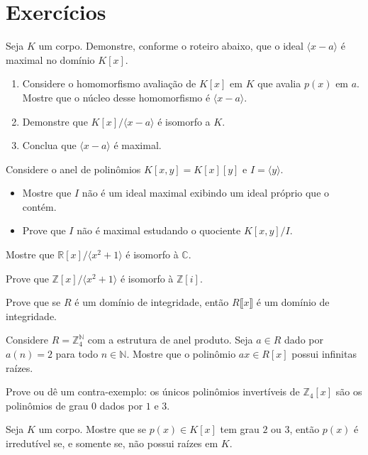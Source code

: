 \section{Exercícios}
\begin{exer}
    Seja $K$ um corpo. Demonstre, conforme o roteiro abaixo, que o ideal $\langle x-a\rangle$ é maximal no domínio $K[x]$.
    \begin{enumerate}[label=\alph*)]
        \item Considere o homomorfismo avaliação de $K[x]$ em $K$ que avalia $p(x)$ em $a$. Mostre que o núcleo desse homomorfismo é $\langle x-a\rangle$.
        \item Demonstre que $K[x]/\langle x-a\rangle$ é isomorfo a $K$.
        \item Conclua que $\langle x-a\rangle$ é maximal.
    \end{enumerate}
\end{exer}
\begin{exer}
    Considere o anel de polinômios $K[x, y]=K[x][y]$ e  $I=\langle y\rangle$.
    \begin{itemize}
        \item Mostre que $I$ não é um ideal maximal exibindo um ideal próprio que o contém.
        \item Prove que $I$ não é maximal estudando o quociente $K[x, y]/I$.
    \end{itemize}
\end{exer}
\begin{exer}
Mostre que $\mathbb R[x]/\langle x^2+1\rangle$ é isomorfo à $\mathbb C$.
\end{exer}
\begin{exer}
    Prove que $\mathbb Z[x]/\langle x^2+1\rangle$ é isomorfo à $\mathbb Z[i]$.
\end{exer}
\begin{exer}\label{exer:polinomio_serieDominio}
    Prove que se $R$ é um domínio de integridade, então $R\llbracket x \rrbracket$ é um domínio de integridade.
\end{exer}
\begin{exer}
Considere $R=\mathbb Z_4^\mathbb N$ com a estrutura de anel produto. Seja $a \in R$ dado por $a(n)=2$ para todo $n \in \mathbb N$. Mostre que o polinômio $ax \in R[x]$ possui infinitas raízes.
\end{exer}

\begin{exer}
    Prove ou dê um contra-exemplo: os únicos polinômios invertíveis de $\mathbb Z_4[x]$ são os polinômios de grau $0$ dados por $1$ e $3$.
\end{exer}

\begin{exer}
    Seja $K$ um corpo. Mostre que se $p(x)\in K[x]$ tem grau $2$ ou $3$, então $p(x)$ é irredutível se, e somente se, não possui raízes em $K$.
\end{exer}